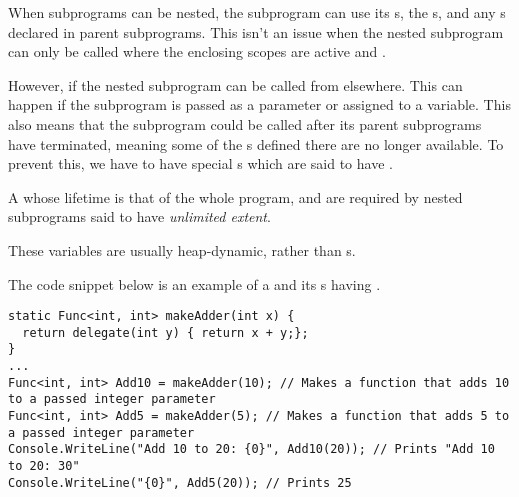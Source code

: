 When subprograms can be nested, the subprogram can use its s, the s, and any s declared in parent subprograms.
This isn't an issue when the nested subprogram can only be called where the enclosing scopes are active and .

However, if the nested subprogram can be called from elsewhere.
This can happen if the subprogram is passed as a parameter or assigned to a variable.
This also means that the subprogram could be called after its parent subprograms have terminated, meaning some of the s defined there are no longer available.
To prevent this, we have to have special s which are said to have \emph{}.

\begin{definition}\label{def:Unlimited_Extent}
  A  whose lifetime is that of the whole program, and are required by nested subprograms said to have \emph{unlimited extent}.

  These variables are usually heap-dynamic, rather than s.
\end{definition}

The code snippet below is an example of a  and its s having .
\begin{verbatim}
static Func<int, int> makeAdder(int x) {
  return delegate(int y) { return x + y;};
}
...
Func<int, int> Add10 = makeAdder(10); // Makes a function that adds 10 to a passed integer parameter
Func<int, int> Add5 = makeAdder(5); // Makes a function that adds 5 to a passed integer parameter
Console.WriteLine("Add 10 to 20: {0}", Add10(20)); // Prints "Add 10 to 20: 30"
Console.WriteLine("{0}", Add5(20)); // Prints 25
\end{verbatim}


